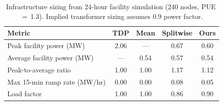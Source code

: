 \begin{table}[t]
\centering
\small
\caption{Infrastructure sizing from 24-hour facility simulation (240 nodes, PUE\,$=$\,1.3). Implied transformer sizing assumes 0.9 power factor.}
\label{tab:facility-sizing}
\vspace{0.4em}
\begin{tabular}{lcccc}
\toprule
\textbf{Metric} & \textbf{TDP} & \textbf{Mean} & \textbf{Splitwise} & \textbf{Ours} \\
\midrule
Peak facility power (MW) & 2.06 & --- & 0.67 & 0.60 \\
Average facility power (MW) & --- & 0.54 & 0.57 & 0.54 \\
Peak-to-average ratio & 1.00 & 1.00 & 1.17 & 1.12 \\
Max 15-min ramp rate (MW/hr) & 0.00 & 0.00 & 0.08 & 0.05 \\
Load factor & 1.00 & 1.00 & 0.86 & 0.90 \\
\bottomrule
\end{tabular}
\end{table}
